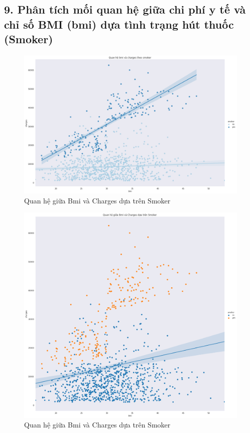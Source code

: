 \documentclass{article}
\begin{document}
	\subsection{9. Phân tích mối quan hệ giữa chi phí y tế và chỉ số BMI (bmi) dựa tình trạng hút thuốc (Smoker)}
	\begin{figure}[H]
		\centering
		\includegraphics[width=1\textwidth]{images/bmi_charges_by_smoker.png}
		\caption{Quan hệ giữa Bmi và Charges dựa trên Smoker}
		\label{fig:writing-thesis}
	\end{figure}
	\begin{figure}[H]
		\centering
		\includegraphics[width=1\textwidth]{images/reg_bmi_charges_by_smoker.png}
		\caption{Quan hệ giữa Bmi và Charges dựa trên Smoker}
		\label{fig:writing-thesis}
	\end{figure}
	
\end{document}
